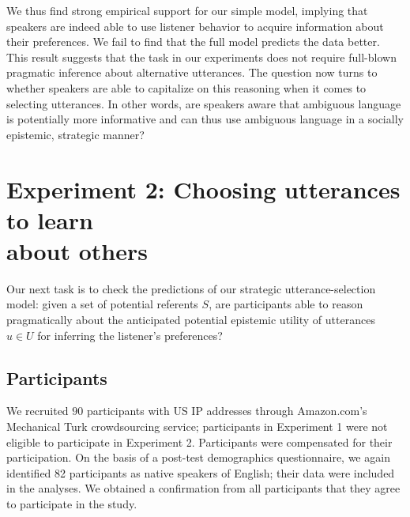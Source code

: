 \documentclass[11pt,a4paper]{article}
\begin{document}
We thus find strong empirical support for our simple model, implying that speakers are indeed able to use listener behavior to acquire information about their preferences. We fail to find that the full model predicts the data better.
This result suggests that the task in our experiments does not require full-blown pragmatic inference about alternative utterances.
The question now turns to whether speakers are able to capitalize on this reasoning when it comes to selecting utterances. In other words, are speakers aware that ambiguous language is potentially more informative and can thus use ambiguous language in a socially epistemic, strategic manner?

\section{Experiment 2: Choosing utterances to learn \\ about others} \label{experiment2}

Our next task is to check the predictions of our strategic utterance-selection model: given a set of potential referents $S$, are participants able to reason pragmatically about the anticipated potential epistemic utility of utterances $u\in U$ for inferring the listener's preferences? 
%


\subsection{Participants}

We recruited $90$ participants with US IP addresses through Amazon.com's Mechanical Turk crowdsourcing service; participants in Experiment 1 were not eligible to participate in Experiment 2. Participants were compensated for their participation. On the basis of a post-test demographics questionnaire, we again identified 82 participants as native speakers of English; their data were included in the analyses. We obtained a confirmation from all participants that they agree to participate in the study.
\end{document}
